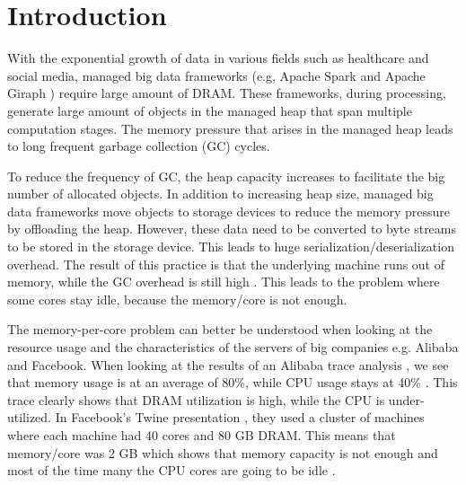 \section{Introduction}
\label{sec:intro}

With the exponential growth of data in various fields such as
healthcare and social media, managed big data frameworks (e.g, Apache Spark \cite{Spark} and
Apache Giraph \cite{Giraph}) require large amount of DRAM. 
These frameworks, during processing, generate large amount of objects
in the managed heap that span multiple computation stages.
The memory pressure that arises in the managed heap leads to long frequent garbage
collection (GC) cycles.

To reduce the frequency of GC, the heap capacity increases to
facilitate the big number of allocated objects. In addition to
increasing heap size, managed big data frameworks move objects to
storage devices to reduce the memory pressure by offloading the heap. 
However, these data need to be converted to byte streams to be stored in the storage device.
This leads to huge serialization/deserialization overhead.
The result of this practice is that the underlying machine runs out of
memory, while the GC overhead is still high .
This leads to the problem where some cores stay idle, because the
memory/core is not enough.

The memory-per-core problem can better be understood when looking at
the resource usage and the characteristics of the servers of big
companies e.g. Alibaba and Facebook. When looking at the results of an
Alibaba trace analysis \cite{Alibaba}, we see that memory usage is at
an average of 80\%, while CPU usage stays at 40\% . This trace clearly
shows that DRAM utilization is high, while the CPU is under-utilized.
In Facebook's Twine presentation \cite{Twine}, they used a cluster of
machines where each machine had 40 cores and 80 GB DRAM. This means
that memory/core was 2 GB which shows that memory capacity is not
enough and most of the time many the CPU cores are going to be idle
.

